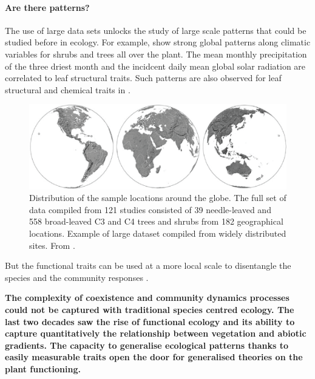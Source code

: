 

\paragraph{Are there patterns?}


The use of large data sets unlocks the study of large scale patterns that could be studied before in ecology. For example, \cite{niinemets_global-scale_2001} show strong global patterns along climatic variables for shrubs and trees all over the plant. The mean monthly precipitation of the three driest month and the incidcent daily mean global solar radiation are correlated to leaf structural traits. Such patterns are also observed for leaf structural and chemical traits in \cite{wright_worldwide_2004}.

\begin{figure}
    \includegraphics[width=1\linewidth]{./1_Introduction/graphics/map_niinemets.png}
  \caption[Site distribution for the paper \cite{niinemets_global-scale_2001}]{Distribution of the sample locations around the globe. The full set of data compiled from 121 studies consisted of 39 needle-leaved and 558 broad-leaved C3 and C4 trees and shrubs from 182 geographical locations. Example of large dataset compiled from widely distributed sites. From \cite{niinemets_global-scale_2001}.}
  \label{fig:paradigm_shift}
\end{figure}

But the functional traits can be used at a more local scale to disentangle the species and the community responses \cite{kichenin_contrasting_2013, jung_intraspecific_2014}.
%



\textbf{The complexity of coexistence and community dynamics processes could not be captured with traditional species centred ecology. The last two decades saw the rise of functional ecology and its ability to capture quantitatively the relationship between vegetation and abiotic gradients. The capacity to generalise ecological patterns thanks to easily measurable traits open the door for generalised theories on the plant functioning.}

